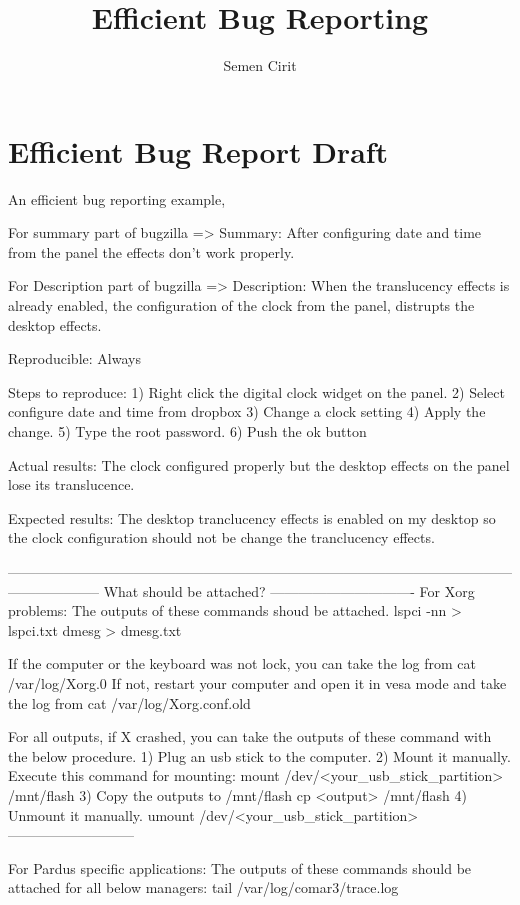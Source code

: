 \documentclass[a4paper,10pt]{article}
\title{Efficient Bug Reporting}
\author{Semen Cirit}
\begin{document}
\maketitle

\section{Efficient Bug Report Draft}
	
An efficient bug reporting example,

For summary part of bugzilla =>
Summary: After configuring date and time from the panel the effects don't work properly.

For Description part of bugzilla =>
Description:
When the translucency effects is already enabled, the configuration of the clock from the panel, distrupts the desktop effects.

Reproducible: Always

Steps to reproduce:
1) Right click the digital clock widget on the panel.
2) Select configure date and time from dropbox
3) Change a clock setting
4) Apply the change.
5) Type the root password.
6) Push the ok button

Actual results:
The clock configured properly but the desktop effects on the panel lose its translucence.

Expected results:
The desktop tranclucency effects is enabled on my desktop so the clock configuration should not be change the tranclucency effects.

--------------------------------------------------------------------------------------------------------------------------------
What should be attached?
-------------------------------
For Xorg problems:
The outputs of these commands shoud be attached.
lspci -nn > lspci.txt
dmesg > dmesg.txt

If the computer or the keyboard was not lock, you can take the log from 
cat /var/log/Xorg.0
If not, restart your computer and open it in vesa mode and take the log from
cat /var/log/Xorg.conf.old

For all outputs, if X crashed, you can take the outputs of these command with the below procedure.
1) Plug an usb stick to the computer.
2) Mount it manually.
    Execute this command for mounting:
    mount /dev/<your_usb_stick_partition> /mnt/flash
3) Copy the outputs to /mnt/flash
     cp <output> /mnt/flash
4) Unmount it manually.
  umount /dev/<your_usb_stick_partition>
---------------------------

For Pardus specific applications:
The outputs of these commands should be attached for all below managers:
 tail /var/log/comar3/trace.log
\end{document}
